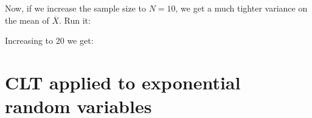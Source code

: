 \begin{fullwidth}
\step Now, if we increase the sample size to $N=10$, we get a much tighter variance on the mean of $\overline{X}$. Run it:


\step Increasing to 20 we get:


\section{CLT applied to exponential random variables}


\end{fullwidth}
